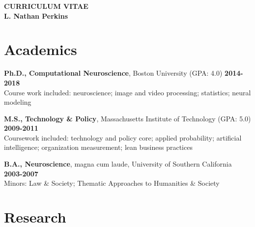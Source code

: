 
\thispagestyle{empty}

\begin{center}
{\LARGE {\bf CURRICULUM VITAE}}\\
\vspace{0.5in}
{\large {\bf L. Nathan Perkins}}
\end{center}

\newenvironment{list1}{
  \begin{list}{\ding{113}}{%
      \setlength{\itemsep}{0in}
      \setlength{\parsep}{0in} \setlength{\parskip}{0in}
      \setlength{\topsep}{0in} \setlength{\partopsep}{0in} 
      \setlength{\leftmargin}{0in}}}{\end{list}}

\newenvironment{list2}{
  \begin{list}{$\bullet$}{%
      \setlength{\itemsep}{0in}
      \setlength{\parsep}{0in} \setlength{\parskip}{0in}
      \setlength{\topsep}{0in} \setlength{\partopsep}{0in} 
      \setlength{\leftmargin}{0.25in}}}{\end{list}}


\section*{Academics}

\textbf{Ph.D., Computational Neuroscience}, Boston University (GPA: 4.0) \hfill \textbf{2014-2018} \\
	Course work included: neuroscience; image and video processing; statistics; neural modeling

\textbf{M.S., Technology \& Policy}, Massachusetts Institute of Technology (GPA: 5.0) \hfill \textbf{2009-2011} \\
	Coursework included: technology and policy core; applied probability; artificial intelligence; organization measurement; lean business practices

\textbf{B.A., Neuroscience}, magna cum laude, University of Southern California \hfill \textbf{2003-2007} \\
	Minors: Law \& Society; Thematic Approaches to Humanities \& Society
	
\section*{Research}

